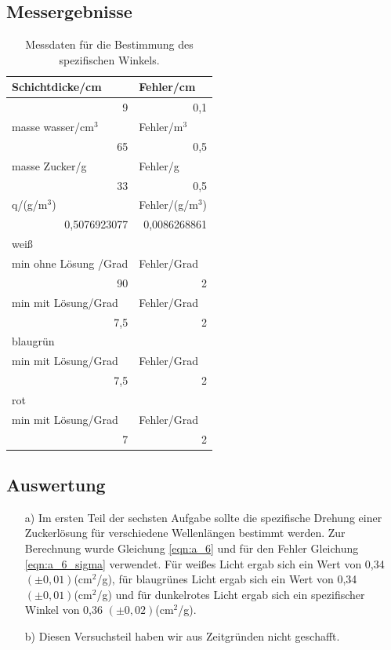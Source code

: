 \documentclass[12pt]{scrartcl}
\begin{document}
\subsection{Messergebnisse}
\begin{table}[H]
\caption{Messdaten für die Bestimmung des spezifischen Winkels.}
\begin{center}
\begin{tabular}{|l|l|}
\hline
Schichtdicke/cm & Fehler/cm \\ \hline
\multicolumn{1}{|r|}{9} & \multicolumn{1}{r|}{0,1} \\ \hline
masse wasser/cm$^3$ & Fehler/m$^3$ \\ \hline
\multicolumn{1}{|r|}{65} & \multicolumn{1}{r|}{0,5} \\ \hline
masse Zucker/g & Fehler/g \\ \hline
\multicolumn{1}{|r|}{33} & \multicolumn{1}{r|}{0,5} \\ \hline
q/(g/m$^3$) & Fehler/(g/m$^3$) \\ \hline
\multicolumn{1}{|r|}{0,5076923077} & \multicolumn{1}{r|}{0,0086268861} \\ \hline
weiß &  \\ \hline
min ohne Lösung /Grad & Fehler/Grad \\ \hline
\multicolumn{1}{|r|}{90} & \multicolumn{1}{r|}{2} \\ \hline
min mit Lösung/Grad & Fehler/Grad \\ \hline
\multicolumn{1}{|r|}{7,5} & \multicolumn{1}{r|}{2} \\ \hline
blaugrün &  \\ \hline
min mit Lösung/Grad & Fehler/Grad \\ \hline
\multicolumn{1}{|r|}{7,5} & \multicolumn{1}{r|}{2} \\ \hline
rot &  \\ \hline
min mit Lösung/Grad & Fehler/Grad \\ \hline
\multicolumn{1}{|r|}{7} & \multicolumn{1}{r|}{2} \\ \hline
\end{tabular}
\end{center}
\label{tab:a_6}
\end{table}
\subsection{Auswertung}
\begin{enumerate}
\item[a)]
Im ersten Teil der sechsten Aufgabe sollte die spezifische Drehung einer Zuckerlösung für verschiedene Wellenlängen bestimmt werden. Zur Berechnung wurde Gleichung \ref{eqn:a_6} und für den Fehler Gleichung \ref{eqn:a_6_sigma} verwendet. Für weißes Licht ergab sich ein Wert von 0,34 $(\pm 0,01)$(cm$^2$/g), für blaugrünes Licht ergab sich ein Wert von 0,34 $(\pm 0,01)$(cm$^2$/g) und für dunkelrotes Licht ergab sich ein spezifischer Winkel von 0,36 $(\pm 0,02)$(cm$^2$/g).

\item[b)]
Diesen Versuchsteil haben wir aus Zeitgründen nicht geschafft.
\end{enumerate}
\end{document}

